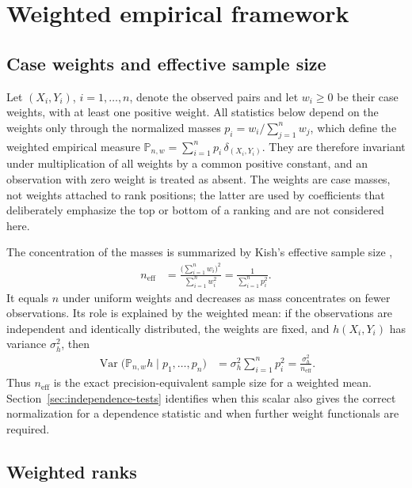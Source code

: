 \section{Weighted empirical framework}
\label{sec:framework}

\subsection{Case weights and effective sample size}

Let $(X_i,Y_i)$, $i=1,\ldots,n$, denote the observed pairs and let
$w_i\geq 0$ be their case weights, with at least one positive weight. All
statistics below depend on the weights only through the normalized masses
$p_i = w_i/\sum_{j=1}^n w_j$, which define the weighted empirical measure
$\mathbb{P}_{n,w} = \sum_{i=1}^n p_i\,\delta_{(X_i,Y_i)}$. They are therefore
invariant under multiplication of all weights by a common positive constant,
and an observation with zero weight is treated as absent. The weights are case
masses, not weights attached to rank positions; the latter are used by
coefficients that deliberately emphasize the top or bottom of a ranking
\citep{shieh1998} and are not considered here.

The concentration of the masses is summarized by Kish's effective sample size
\citep{kish1965},
\begin{align*}
    n_{\mathrm{eff}}
    &= \frac{\bigl(\sum_{i=1}^n w_i\bigr)^2}{\sum_{i=1}^n w_i^2}
    = \frac{1}{\sum_{i=1}^n p_i^2}.
\end{align*}
It equals $n$ under uniform weights and decreases as mass concentrates on
fewer observations. Its role is explained by the weighted mean: if the
observations are independent and identically distributed, the weights are
fixed, and $h(X_i,Y_i)$ has variance $\sigma_h^2$, then
\begin{align*}
    \operatorname{Var}\bigl(\mathbb{P}_{n,w}h \mid p_1,\ldots,p_n\bigr)
    &= \sigma_h^2\sum_{i=1}^n p_i^2
    = \frac{\sigma_h^2}{n_{\mathrm{eff}}}.
\end{align*}
Thus $n_{\mathrm{eff}}$ is the exact precision-equivalent sample size for a
weighted mean. Section~\ref{sec:independence-tests} identifies when this
scalar also gives the correct normalization for a dependence statistic and
when further weight functionals are required.

\subsection{Weighted ranks}
\label{subsec:weighted-ranks}

